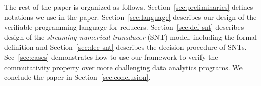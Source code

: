 The rest of the paper is organized as follows. Section~\ref{sec:preliminaries} defines notations we use in the paper. Section~\ref{sec:language} describes our design of the verifiable programming language for reducers. Section~\ref{sec:def-snt} describes design of the \emph{streaming numerical transducer} (SNT) model, including the formal definition and Section~\ref{sec:dec-snt} describes the decision procedure of SNTs. Sec~\ref{sec:cases} demonstrates how to use our framework to verify the commutativity property over more challenging data analytics programs. We conclude the paper in Section~\ref{sec:conclusion}. 